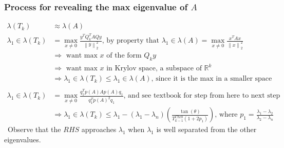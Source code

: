 \documentclass{article}
\newcommand{\norm}[2]{\left\lVert#1\right\rVert_#2}
\begin{document}
\subsubsection{Process for revealing the max eigenvalue of $A$}
\begin{align*}
    \lambda(T_k) &\approx \lambda(A)\\
    \lambda_1 \in \lambda(T_k) &= \max_{x \neq 0} \frac{y^TQ_k^TAQy}{\norm{y}{2}^2} \textrm{, by property that } \lambda_1 \in \lambda(A) = \max_{x \neq 0} \frac{x^TAx}{\norm{x}{2}^2}\\
    &\Longrightarrow \textrm{ want max $x$ of the form } Q_ky \\
    &\Longrightarrow \textrm{ want max $x$ in Krylov space, a subspace of } \mathbb{R}^k\\
    &\Longrightarrow \lambda_1 \in \lambda(T_k) \leq \lambda_1 \in \lambda(A) \textrm{, since it is the max in a smaller space} \\ \\
    \lambda_1 \in \lambda(T_k) &= \max_{x \neq 0} \frac{q_1^Tp(A)Ap(A)q_1}{q_1^Tp(A)^2q_1} \textrm{, and see textbook for step from here to next step}\\
    &\Longrightarrow \lambda_1 \in \lambda(T_k) \leq \lambda_1 - (\lambda_1-\lambda_n)(\frac{\tan(\theta)}{T_{k-1}^{Cheb}(1+2p_1)}) \textrm{, where } p_1 = \frac{\lambda_1 - \lambda_2}{\lambda_2 - \lambda_n}
\end{align*}\
Observe that the $RHS$ approaches $\lambda_1$ when $\lambda_1$ is well separated from the other eigenvalues. 
\end{document}
